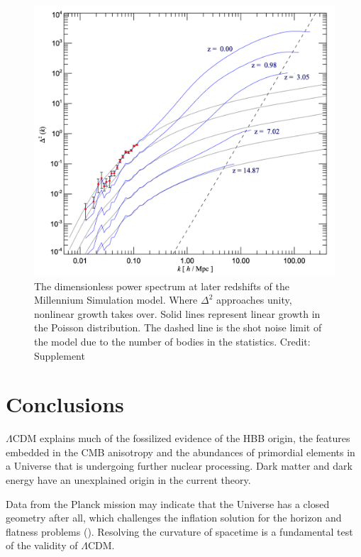 \documentclass{paper}
\begin{document}
  \begin{figure}[H]
    \begin{centering}
    \includegraphics[scale=0.4]{Struct-power_spectrum.pdf}
    \caption{The dimensionless power spectrum at later redshifts of the
      Millennium Simulation model. Where \(\Delta^2\) approaches unity, 
      nonlinear growth takes over. Solid lines represent linear growth in the 
      Poisson distribution. The dashed line is the shot noise limit of the 
      model due to the number of bodies in the statistics.
      Credit: \cite{2005Natur.435..629S} Supplement}
    \label{fig:Struct-power_spectrum}
    \end{centering}
  \end{figure}

\section*{Conclusions}
  $\Lambda$CDM explains much of the fossilized evidence of the HBB origin, the 
  features embedded in the CMB anisotropy and the abundances of primordial 
  elements in a Universe that is undergoing further nuclear processing. Dark 
  matter and dark energy have an unexplained origin in the current theory.

  Data from the Planck mission may indicate that the Universe has a closed 
  geometry after all, which challenges the inflation solution for the horizon
  and flatness problems (\cite{2020NatAs...4..196D}). Resolving the curvature 
  of spacetime is a fundamental test of the validity of $\Lambda$CDM. 
\end{document}
